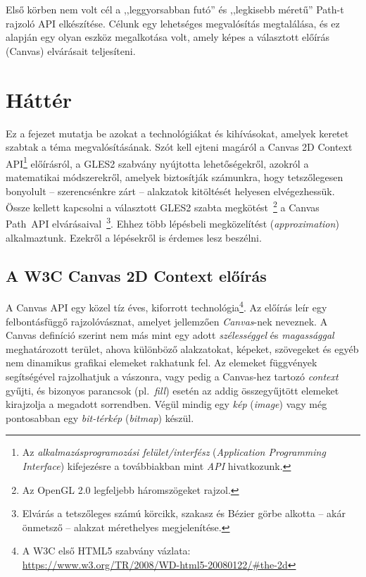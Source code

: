 \documentclass[12pt]{report}
\theoremstyle{definition}
\newcommand{\inenglish}[1]{\textsl{#1}}
\begin{document}
Első körben nem volt cél a ,,leggyorsabban futó'' és ,,legkisebb méretű''
Path-t rajzoló API elkészítése. Célunk egy lehetséges megvalósítás megtalálása,
és ez alapján egy olyan eszköz megalkotása volt, amely képes a választott
előírás (Canvas) elvárásait teljesíteni.



    \chapter{Háttér}
    \label{Háttér}

Ez a fejezet mutatja be azokat a technológiákat és kihívásokat, amelyek keretet
szabtak a téma megvalósításának. Szót kell ejteni magáról a Canvas 2D Context
API\footnote{Az \emph{alkalmazásprogramozási felület/interfész}
(\inenglish{Application Programming Interface}) kifejezésre a továbbiakban mint
\emph{API} hivatkozunk.} előírásról, a GLES2 szabvány nyújtotta lehetőségekről,
azokról a matematikai módszerekről, amelyek biztosítják számunkra, hogy
tetszőlegesen bonyolult -- szerencsénkre zárt -- alakzatok kitöltését helyesen
elvégezhessük. Össze kellett kapcsolni a választott GLES2 szabta
megkötést~\footnote { Az OpenGL 2.0 legfeljebb háromszögeket rajzol. } a Canvas
Path~API elvárásaival~\footnote { Elvárás a tetszőleges számú körcikk, szakasz
és Bézier görbe alkotta -- akár önmetsző -- alakzat mérethelyes megjelenítése.
}. Ehhez több lépésbeli megközelítést (\inenglish{approximation}) alkalmaztunk.
Ezekről a lépésekről is érdemes lesz beszélni.

    \section[A Canvas 2D Context előírás]{A W3C Canvas 2D Context előírás}
    \label{A Canvas előírás}

A Canvas API egy közel tíz éves, kiforrott technológia\footnote {A W3C első
HTML5 szabvány vázlata:\\ \footnotesize{
\url{https://www.w3.org/TR/2008/WD-html5-20080122/\#the-2d}} }. Az előírás leír
egy felbontásfüggő rajzolóvásznat, amelyet jellemzően \emph{Canvas}-nek
neveznek. A Canvas definíció szerint nem más mint egy adott \emph{szélességgel}
és \emph{magassággal} meghatározott terület, ahova különböző alakzatokat,
képeket, szövegeket és egyéb nem dinamikus grafikai elemeket rakhatunk fel. Az
elemeket függvények segítségével rajzolhatjuk a vászonra, vagy pedig a
Canvas-hez tartozó \emph{context} gyűjti, és bizonyos parancsok
(pl.~\emph{fill}) esetén az addig összegyűjtött elemeket kirajzolja a megadott
sorrendben. Végül mindig egy \emph{kép} (\inenglish{image}) vagy még
pontosabban egy \emph{bit-térkép} (\inenglish{bitmap}) készül.
\end{document}
